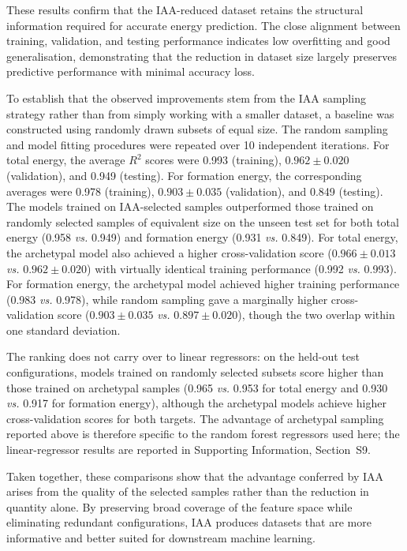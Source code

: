 \documentclass{WileyMSP-template}
\newcommand{\revision}[1]{{\color{red}#1}}
\begin{document}
These results confirm that the IAA-reduced dataset retains the structural information required for accurate energy prediction. The close alignment between training, validation, and testing performance indicates low overfitting and good generalisation, demonstrating that the reduction in dataset size \revision{largely preserves predictive performance with minimal accuracy loss}.

To establish that the observed improvements stem from the IAA sampling strategy rather than from simply working with a smaller dataset, a baseline was constructed using randomly drawn subsets of equal size. The random sampling and model fitting procedures were repeated over 10 independent iterations. For total energy, the average $R^2$ scores were \revision{0.993} (training), \revision{$0.962 \pm 0.020$} (validation), and \revision{0.949} (testing). For formation energy, the corresponding averages were \revision{0.978} (training), \revision{$0.903 \pm 0.035$} (validation), and \revision{0.849} (testing). \revision{The models trained on IAA-selected samples outperformed those trained on randomly selected samples of equivalent size on the unseen test set for both total energy (0.958 \textit{vs.} 0.949) and formation energy (0.931 \textit{vs.} 0.849). For total energy, the archetypal model also achieved a higher cross-validation score ($0.966 \pm 0.013$ \textit{vs.} $0.962 \pm 0.020$) with virtually identical training performance (0.992 \textit{vs.} 0.993). For formation energy, the archetypal model achieved higher training performance (0.983 \textit{vs.} 0.978), while random sampling gave a marginally higher cross-validation score ($0.903 \pm 0.035$ \textit{vs.} $0.897 \pm 0.020$), though the two overlap within one standard deviation.}

\revision{The ranking does not carry over to linear regressors: on the held-out test configurations, models trained on randomly selected subsets score higher than those trained on archetypal samples (0.965 \textit{vs.} 0.953 for total energy and 0.930 \textit{vs.} 0.917 for formation energy), although the archetypal models achieve higher cross-validation scores for both targets. The advantage of archetypal sampling reported above is therefore specific to the random forest regressors used here; the linear-regressor results are reported in Supporting Information, Section~S9.}

Taken together, these comparisons show that the advantage conferred by IAA arises from the quality of the selected samples rather than the reduction in quantity alone. By preserving broad coverage of the feature space while eliminating redundant configurations, IAA produces datasets that are more informative and better suited for downstream machine learning.
\end{document}
